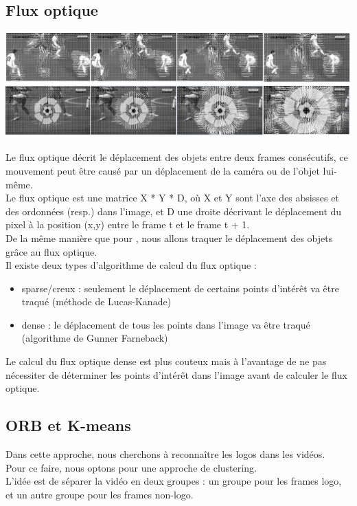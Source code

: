 \documentclass[11pt]{article}
\begin{document}
\subsection{Flux optique}
\label{sec:org239d620}
\begin{center}
\includegraphics[width=.9\linewidth]{optical_flow_2.png}
\end{center}
Le flux optique décrit le déplacement des objets entre deux frames consécutifs, ce mouvement peut être causé par un déplacement de la caméra ou de l'objet lui-même.\\
Le flux optique est une matrice X * Y * D, où X et Y sont l'axe des absisses et des ordonnées (resp.) dans l'image, et D une droite décrivant le déplacement du pixel à la position (x,y) entre le frame t et le frame t + 1.\\

De la même manière que pour \cite{wang11_action}, nous allons traquer le déplacement des objets grâce au flux optique.\\
Il existe deux types d'algorithme de calcul du flux optique :\\
\begin{itemize}
\item sparse/creux : seulement le déplacement de certains points d'intérêt va être traqué (méthode de Lucas-Kanade)\\
\item dense : le déplacement de tous les points dans l'image va être traqué (algorithme de Gunner Farneback)\\
\end{itemize}
Le calcul du flux optique dense est plus couteux mais à l'avantage de ne pas nécessiter de déterminer les points d'intérêt dans l'image avant de calculer le flux optique.\\

\subsection{ORB et K-means}
\label{sec:org44e3fd8}
Dans cette approche, nous cherchons à reconnaître les logos dans les vidéos.\\
Pour ce faire, nous optons pour une approche de clustering.\\
L'idée est de séparer la vidéo en deux groupes : un groupe pour les frames logo, et un autre groupe pour les frames non-logo.\\
\end{document}
